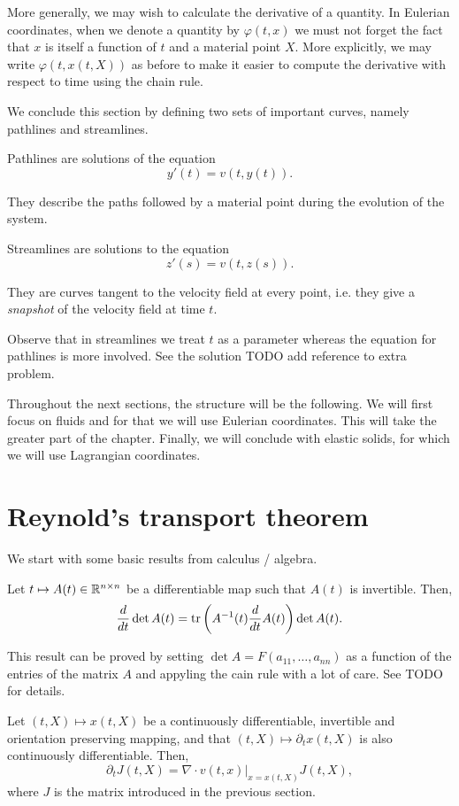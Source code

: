 More generally, we may wish to calculate the derivative of a quantity. In
Eulerian coordinates, when we denote a quantity by $\varphi(t, x)$ we must not
forget the fact that $x$ is itself a function of $t$ and a material point $X$.
More explicitly, we may write $\varphi(t, x(t, X))$ as before to make it easier
to compute the derivative with respect to time using the chain rule.


We conclude this section by defining two sets of important curves, namely
pathlines and streamlines.

\begin{dfn}
  [Pathlines]

  Pathlines are solutions of the equation
  \[
    y'(t) = v(t, y(t)).
  \]
\end{dfn}

They describe the paths followed by a material point during the evolution of
the system.

\begin{dfn}
  [Streamlines]

  Streamlines are solutions to the equation
  \[
    z'(s) = v(t, z(s)).
  \]
\end{dfn}

They are curves tangent to the velocity field at every point, i.e. they give a
\textit{snapshot} of the velocity field at time $t$.

Observe that in streamlines we treat $t$ as a parameter whereas the equation
for pathlines is more involved. See the solution TODO add reference to extra problem.


Throughout the next sections, the structure will be the following. We will
first focus on fluids and for that we will use Eulerian coordinates.  This will
take the greater part of the chapter. Finally, we will conclude with elastic
solids, for which we will use Lagrangian coordinates.

\section{Reynold's transport theorem}

We start with some basic results from calculus / algebra.

\begin{lem}
  Let $t \mapsto A(t) \in \mathbb{R}^{n \times n}$ be a differentiable map such that
  $A(t)$ is invertible. Then,
  \[
    \frac{d}{dt} \det A(t) = \operatorname{tr} \left( {A}^{-1}(t) \frac{d}{dt} A(t) \right) \det A(t).
  \]
\end{lem}

This result can be proved by setting $\det A = F(a_{11}, \dots, a_{nn})$ as a
function of the entries of the matrix $A$ and appyling the cain rule with a lot
of care. See TODO for details.

\begin{thm}
  Let $(t, X) \mapsto x(t, X)$ be a continuously differentiable, invertible and
  orientation preserving mapping, and that $(t, X) \mapsto \partial_t x(t, X)$
  is also continuously differentiable. Then,
  \[
    \partial_t J(t, X) = \left. \nabla \cdot v(t, x)\right|_{x = x(t, X)} J(t, X),
  \]
  where $J$ is the matrix introduced in the previous section.
\end{thm}
